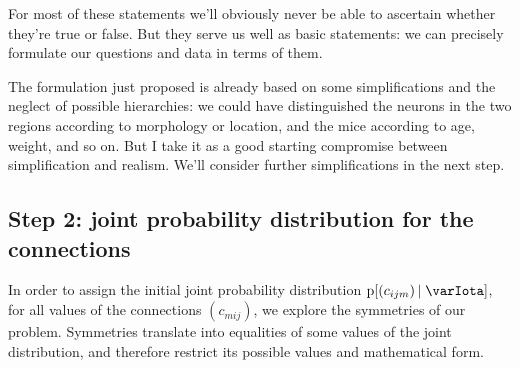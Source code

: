 \documentclass[\ifafour a4paper,12pt,\else a5paper,10pt,\fi%
onecolumn,oneside,article,%
british%
]{memoir}
\theoremstyle{remark}
\theoremstyle{innote}
\newcommand*{\pf}{\mathrm{p}}%
\renewcommand*{\|}[1][]{\nonscript\,#1\vert\nonscript\;\mathopen{}}
\newcommand*{\yI}{\varIota}
\newcommand*{\yc}{c}
\begin{document}
For most of these statements we'll obviously never be able to ascertain
whether they're true or false. But they serve us well as basic statements:
we can precisely formulate our questions and data in terms of them.

\bigskip

The formulation just proposed is already based on some simplifications and
the neglect of possible hierarchies: we could have distinguished the
neurons in the two regions according to morphology or location, and the
mice according to age, weight, and so on. But I take it as a good starting
compromise between simplification and realism. We'll consider further
simplifications in the next step.

\subsection{Step 2: joint probability distribution for the connections}
\label{sec:step_joint_prob}


In order to assign the initial joint probability distribution
$\pf[(\yc_{ijm}) \| \yI]$, for all values of the connections $(\yc_{mij})$,
we explore the symmetries of our problem. Symmetries translate into
equalities of some values of the joint distribution, and therefore restrict
its possible values and mathematical form.
\end{document}

